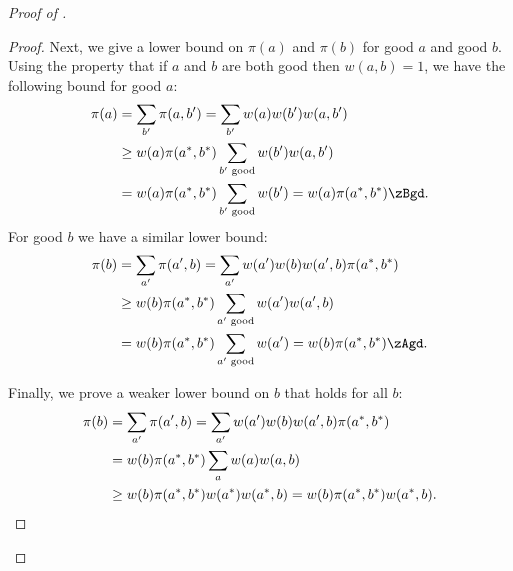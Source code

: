 \documentclass{toc}
\begin{document}
\begin{proof}[Proof of ]
\begin{proof}
 Next, we give a lower bound on $\pi(a)$ and 
$\pi(b)$ for good $a$ and good $b$.  Using the property that if $a$ and 
$b$ are both good then $w(a,b) = 1$, we have the following bound for 
good $a$:
\begin{align*}
\pi(a) &=  \sum_{b'}\pi(a,b') = \sum_{b'} w(a)w(b') w(a,b')\\
&\geq w(a) \pi(a^*,b^*) \sum_{b' \text{ good}} w(b')w(a,b')\\
&= w(a) \pi(a^*,b^*) \sum_{b' \text{ good}} w(b') = w(a) \pi(a^*,b^*)\zBgd.\\
\end{align*}
\noindent For good $b$ we have a similar lower bound: 
\begin{align*}
\pi(b) &=  \sum_{a'}\pi(a',b) = \sum_{a'} w(a')w(b) w(a',b)\pi(a^*,b^*)\\
&\geq w(b) \pi(a^*,b^*) \sum_{a' \text{ good}} w(a')w(a',b)\\
&= w(b) \pi(a^*,b^*) \sum_{a' \text{ good}} w(a') = w(b) \pi(a^*,b^*)\zAgd.\\
\end{align*}



 Finally, we prove a weaker lower bound on $b$ that 
holds for all $b$:
\begin{align*}
\pi(b) &= \sum_{a'}\pi(a',b) = \sum_{a'} w(a')w(b) w(a',b)\pi(a^*,b^*)\\
&= w(b)\pi(a^*,b^*) \sum_a w(a)w(a,b)\\
&\geq w(b)\pi(a^*,b^*) w(a^*)w(a^*,b) = w(b)\pi(a^*,b^*)w(a^*,b).\qedhere
\end{align*}
\end{proof}


\end{proof}
\end{document}
